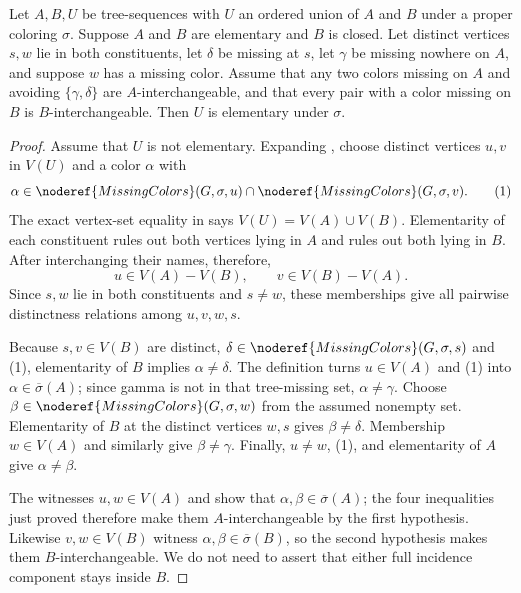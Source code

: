 \begin{helper}
Let $A,B,U$ be tree-sequences with $U$ an ordered union of $A$ and $B$
under a proper coloring $\sigma$.  Suppose $A$ and $B$ are elementary and
$B$ is closed.  Let distinct vertices $s,w$ lie in both constituents, let
$\delta$ be missing at $s$, let $\gamma$ be missing nowhere on $A$, and
suppose $w$ has a missing color.  Assume that any two colors missing on $A$
and avoiding $\{\gamma,\delta\}$ are $A$-interchangeable, and that every
pair with a color missing on $B$ is $B$-interchangeable.  Then $U$ is
elementary under $\sigma$.
\end{helper}
\begin{proof}
Assume that $U$ is not elementary.  Expanding
, choose distinct vertices $u,v$ in
$V(U)$ and a color $\alpha$ with
\[
 \alpha\in\noderef{MissingColors}(G,\sigma,u)
 \cap\noderef{MissingColors}(G,\sigma,v).                       \tag{1}
\]
The exact vertex-set equality in  says
$V(U)=V(A)\cup V(B)$.  Elementarity of each constituent rules out both
vertices lying in $A$ and rules out both lying in $B$.  After interchanging
their names, therefore,
\[
 u\in V(A)-V(B),\qquad v\in V(B)-V(A).
\]
Since $s,w$ lie in both constituents and $s\ne w$, these memberships give
all pairwise distinctness relations among $u,v,w,s$.

Because $s,v\in V(B)$ are distinct,
$\delta\in\noderef{MissingColors}(G,\sigma,s)$ and (1), elementarity of
$B$ implies $\alpha\ne\delta$.  The definition
 turns $u\in V(A)$ and (1) into
$\alpha\in\overline\sigma(A)$; since gamma is not in that tree-missing
set, $\alpha\ne\gamma$.  Choose
$\beta\in\noderef{MissingColors}(G,\sigma,w)$ from the assumed nonempty
set.  Elementarity of $B$ at the distinct vertices $w,s$ gives
$\beta\ne\delta$.  Membership $w\in V(A)$ and
 similarly give $\beta\ne\gamma$.
Finally, $u\ne w$, (1), and elementarity of $A$ give
$\alpha\ne\beta$.

The witnesses $u,w\in V(A)$ and  show that
$\alpha,\beta\in\overline\sigma(A)$; the four inequalities just proved
therefore make them $A$-interchangeable by the first hypothesis.  Likewise
$v,w\in V(B)$ witness
$\alpha,\beta\in\overline\sigma(B)$, so the second hypothesis makes them
$B$-interchangeable.  We do not need to assert that either full incidence
component stays inside $B$.


\end{proof}
